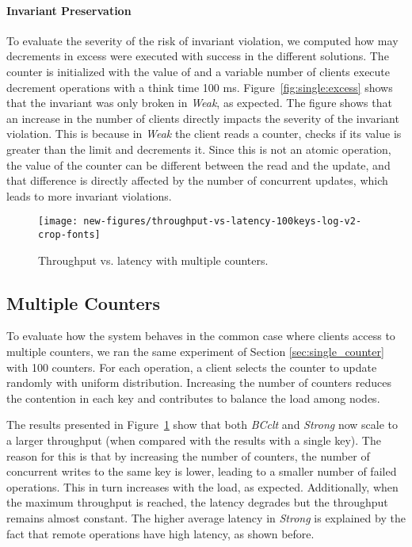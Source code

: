 \documentclass[conference]{IEEEtran}
\begin{document}
\paragraph{Invariant Preservation}
To evaluate the severity of the risk of invariant violation,
we computed how may decrements in excess were executed with success in the different solutions. 
The counter is initialized with the value of  and a variable number of clients 
execute decrement operations with a think time 100 ms.
Figure~\ref{fig:single:excess} shows that the invariant was only broken in \emph{Weak}, as expected.
The figure shows that an increase in the number of clients directly impacts the severity of
the invariant violation. This is because
in \emph{Weak} the client reads a counter, checks if its value is greater than 
the limit and decrements it.
Since this is not an atomic operation, the value of the counter can be different between 
the read and the update, and that difference is directly affected by the number of concurrent updates,
which leads to more invariant violations.





\begin{figure}[t]\centering
\texttt{[image: new-figures/throughput-vs-latency-100keys-log-v2-crop-fonts]}
\vspace{-1ex}
\caption{Throughput vs. latency with multiple counters.}
\label{fig:multiple:throughput}
\end{figure}

\subsection{Multiple Counters}

To evaluate how the system behaves in the common case where clients access to
multiple counters, we ran the same experiment of 
Section \ref{sec:single_counter} with 100 counters.
For each operation, a client selects the counter to update randomly
with uniform distribution. 
Increasing the number of counters reduces the contention in each key and 
contributes to balance the load among nodes.

The results presented in Figure~\ref{fig:multiple:throughput} show that 
both \emph{BCclt} and \emph{Strong} now scale to a larger throughput (when
compared with the results with a single key). 
The reason for this is that by increasing the number of counters, the 
number of concurrent writes to the same key is lower, leading
to a smaller number of failed operations.
This in turn increases with the load, as expected. 
Additionally, when the maximum throughput is reached, the
latency degrades but the throughput remains almost constant. 
The higher average latency in \emph{Strong} is explained by the fact that remote
operations have high latency, as shown before.
\end{document}
